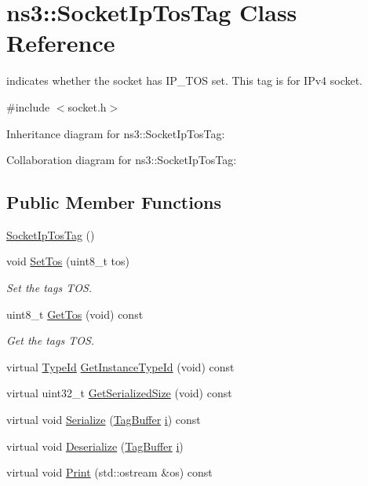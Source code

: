 \hypertarget{classns3_1_1SocketIpTosTag}{}\section{ns3\+:\+:Socket\+Ip\+Tos\+Tag Class Reference}
\label{classns3_1_1SocketIpTosTag}


indicates whether the socket has I\+P\+\_\+\+T\+OS set. This tag is for I\+Pv4 socket.  




{\ttfamily \#include $<$socket.\+h$>$}



Inheritance diagram for ns3\+:\+:Socket\+Ip\+Tos\+Tag\+:


Collaboration diagram for ns3\+:\+:Socket\+Ip\+Tos\+Tag\+:
\subsection*{Public Member Functions}
\begin{DoxyCompactItemize}
\item 
\hyperlink{classns3_1_1SocketIpTosTag_accac8218eaee10e05eaa48cc7f306f11}{Socket\+Ip\+Tos\+Tag} ()
\item 
void \hyperlink{classns3_1_1SocketIpTosTag_a9cd4bdabf70e52ebd36062461c743cd7}{Set\+Tos} (uint8\+\_\+t tos)
\begin{DoxyCompactList}\small\item\em Set the tag\textquotesingle{}s T\+OS. \end{DoxyCompactList}\item 
uint8\+\_\+t \hyperlink{classns3_1_1SocketIpTosTag_a4818db6ec51d75d48309607d0079e623}{Get\+Tos} (void) const 
\begin{DoxyCompactList}\small\item\em Get the tag\textquotesingle{}s T\+OS. \end{DoxyCompactList}\item 
virtual \hyperlink{classns3_1_1TypeId}{Type\+Id} \hyperlink{classns3_1_1SocketIpTosTag_a9aa738f723c6cc90a6719a59dcbae0da}{Get\+Instance\+Type\+Id} (void) const 
\item 
virtual uint32\+\_\+t \hyperlink{classns3_1_1SocketIpTosTag_aa4a56aa92f26addc3108d49f5edf0956}{Get\+Serialized\+Size} (void) const 
\item 
virtual void \hyperlink{classns3_1_1SocketIpTosTag_ad42d403803f7efee911cb0c6316a52fa}{Serialize} (\hyperlink{classns3_1_1TagBuffer}{Tag\+Buffer} \hyperlink{lte__uplink__power__control_8m_a6f6ccfcf58b31cb6412107d9d5281426}{i}) const 
\item 
virtual void \hyperlink{classns3_1_1SocketIpTosTag_ac8e757859c0df22ed1aed601f635a7e8}{Deserialize} (\hyperlink{classns3_1_1TagBuffer}{Tag\+Buffer} \hyperlink{lte__uplink__power__control_8m_a6f6ccfcf58b31cb6412107d9d5281426}{i})
\item 
virtual void \hyperlink{classns3_1_1SocketIpTosTag_aae5b54ef285c2b458a19c44f231685d8}{Print} (std\+::ostream \&os) const 
\end{DoxyCompactItemize}
